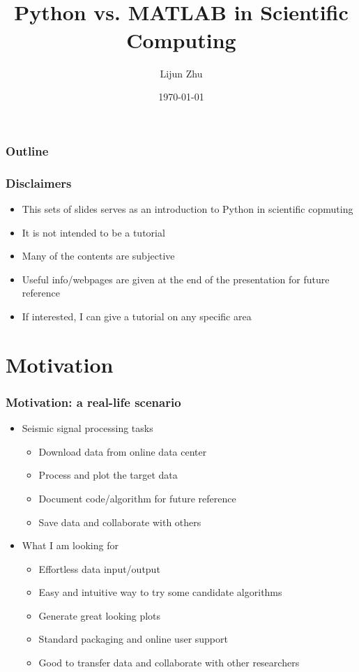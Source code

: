 \documentclass[compress]{beamer}
\title{Python\textsuperscript{\texttrademark} vs. MATLAB\textsuperscript{\textregistered} in Scientific Computing}
\author[shortname]{Lijun Zhu}
\institute{CeGP, Georgia Tech}
\date{\today}
\begin{document}
\begin{frame}
\titlepage
\end{frame}

\setcounter{framenumber}{0}

\begin{frame}
\frametitle{Outline}
\tableofcontents
\end{frame}

\begin{frame}
	\frametitle{Disclaimers}
	\begin{itemize}
		\item This sets of slides serves as an introduction to Python in scientific copmuting
		\item It is not intended to be a tutorial
		\item Many of the contents are subjective
		\item Useful info/webpages are given at the end of the presentation for future reference
		\item If interested, I can give a tutorial on any specific area
	\end{itemize}
\end{frame}

\section{Motivation}
\begin{frame}
	\frametitle{Motivation: a real-life scenario}
	\begin{itemize}
		\item Seismic signal processing tasks
		\begin{itemize}
			\item Download data from online data center
			\item Process and plot the target data
			\item Document code/algorithm for future reference	
			\item Save data and collaborate with others
		\end{itemize}
		\item What I am looking for
		\begin{itemize}
			\item Effortless data input/output
			\item Easy and intuitive way to try some candidate algorithms
			\item Generate great looking plots
			\item Standard packaging and online user support
			\item Good to transfer data and collaborate with other researchers 
		\end{itemize}
	\end{itemize}
\end{frame}
\end{document}
